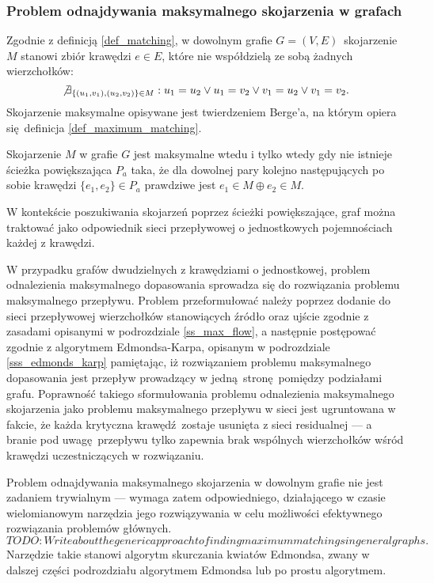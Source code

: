 \subsubsection{\textbf{Problem odnajdywania maksymalnego skojarzenia w grafach}}
\par{
  Zgodnie z definicją \ref{def_matching}, w dowolnym grafie $G=(V,E)$~skojarzenie $M$ stanowi zbiór krawędzi $e \in E$, które nie współdzielą ze sobą żadnych wierzchołków: \[\not\exists_{\{(u_1,v_1), (u_2, v_2)\} \in M}:{u_1 = u_2 \lor u_1 = v_2 \lor v_1 = u_2 \lor v_1 = v_2}.\]
  Skojarzenie maksymalne opisywane jest twierdzeniem Berge'a, na którym opiera się definicja \ref{def_maximum_matching}.
  \begin{theorem}
    Skojarzenie $M$ w grafie $G$ jest maksymalne wtedu i tylko wtedy gdy nie istnieje ścieżka powiększająca $P_a$ taka, że dla dowolnej pary kolejno następujących po sobie krawędzi $\{e_1, e_2\} \in P_a$ prawdziwe jest $e_1 \in M \oplus e_2 \in M$.
  \end{theorem}
   W kontekście poszukiwania skojarzeń poprzez ścieżki powiększające, graf można traktować jako odpowiednik sieci przepływowej o jednostkowych pojemnościach każdej z krawędzi.
}
\par{
  W przypadku grafów dwudzielnych z krawędziami o jednostkowej, problem odnalezienia maksymalnego dopasowania sprowadza się do rozwiązania problemu maksymalnego przepływu.
  Problem przeformułować należy poprzez dodanie do sieci przepływowej wierzchołków stanowiących źródło oraz ujście zgodnie z zasadami opisanymi w podrozdziale \ref{ss_max_flow}, a następnie postępować zgodnie z algorytmem Edmondsa-Karpa, opisanym w podrozdziale \ref{sss_edmonds_karp} pamiętając, iż rozwiązaniem problemu maksymalnego dopasowania jest przepływ prowadzący w jedną stronę pomiędzy podziałami grafu.
  Poprawność takiego sformułowania problemu odnalezienia maksymalnego skojarzenia jako problemu maksymalnego przepływu w sieci jest ugruntowana w fakcie, że każda krytyczna krawędź zostaje usunięta z sieci residualnej --- a branie pod uwagę przepływu tylko zapewnia brak wspólnych wierzchołków wśród krawędzi uczestniczących w rozwiązaniu.
}
\par{
  Problem odnajdywania maksymalnego skojarzenia w dowolnym grafie nie jest zadaniem trywialnym --- wymaga zatem odpowiedniego, działającego w czasie wielomianowym narzędzia jego rozwiązywania w celu możliwości efektywnego rozwiązania problemów głównych.
  \[
    TODO: Write about the generic approach to finding maximum matchings in general graphs.
  \]
  Narzędzie takie stanowi algorytm skurczania kwiatów Edmondsa, zwany w dalszej części podrozdziału algorytmem Edmondsa lub po prostu algorytmem.
}

